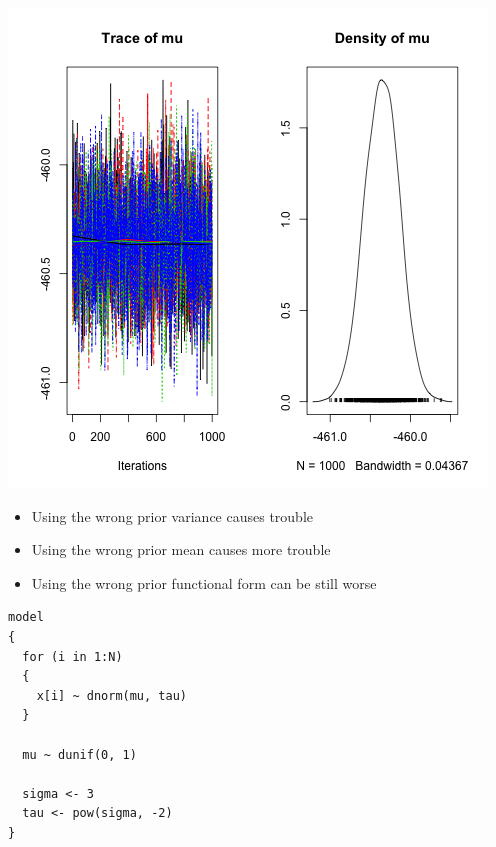 \documentclass{beamer}
\begin{document}
\begin{frame}[fragile]
  \begin{center}
    \includegraphics[scale = 0.4]{../graphs/normal/plot3.png}
  \end{center}
\end{frame}

\begin{frame}[fragile]
  \begin{itemize}
    \item{Using the wrong prior variance causes trouble}
    \item{Using the wrong prior mean causes more trouble}
    \item{Using the wrong prior functional form can be still worse}
  \end{itemize}
\end{frame}

\begin{frame}[fragile]
  \begin{verbatim}
model
{
  for (i in 1:N)
  {
    x[i] ~ dnorm(mu, tau)
  }
  
  mu ~ dunif(0, 1)
  
  sigma <- 3
  tau <- pow(sigma, -2)
}
  \end{verbatim}
\end{frame}
\end{document}

